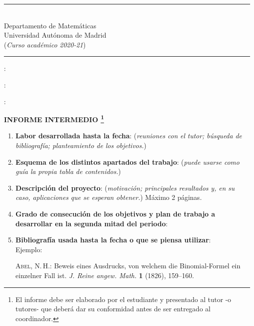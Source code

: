 \documentclass[a4paper,oneside,11pt,leqno]{article}
\begin{document}
\hrule
\vskip 6pt

 \\
Departamento de Matem\'aticas\\
Universidad Aut\'onoma de Madrid\\
\noindent ({\it Curso acad\'emico 2020-21}) 
\vskip 6pt \hrule

\vskip 5mm

:

\vskip 5mm

:

\vskip 5mm

:

\vskip 2cm


\centerline{\bf INFORME INTERMEDIO \footnote{ El informe debe ser elaborado por el estudiante y presentado al tutor -o tutores- que deber\'a dar su conformidad antes de ser entregado al coordinador.}}

\vskip 5mm

\begin{enumerate}

\item[1.-] {\bf Labor desarrollada hasta la fecha}: (\textit{reuniones con el tutor; b\'usqueda de bibliograf\'ia; planteamiento de los objetivos.})

\item[2.-] {\bf Esquema de los distintos apartados del trabajo}: (\textit{puede usarse como gu\'ia la propia tabla de contenidos.})

\item[3.-] {\bf Descripci\'on del proyecto}: (\textit{motivaci\'on; principales resultados y, en su caso, aplicaciones que se esperan obtener.}) M\'aximo 2 p\'aginas.

\item[4.-] {\bf Grado de consecuci\'on de los objetivos y plan de trabajo a desarrollar en la segunda mitad del periodo}: 

\item[5.-] {\bf Bibliograf\'ia usada hasta la fecha o que se piensa utilizar}: \\
Ejemplo:

\begin{thebibliography}{10}

    \textsc{Abel, N.\,H.}: 
    Beweis eines Ausdrucks, von welchem die Binomial-Formel ein einzelner Fall ist. 
    \textit{J. Reine angew. Math.} {\bf1} (1826), 159--160.

\end{thebibliography}


\end{enumerate}
\end{document}
